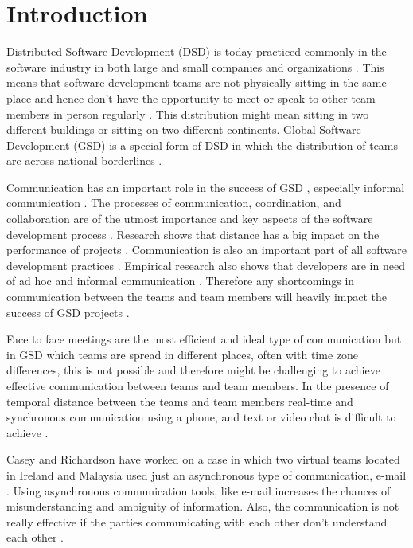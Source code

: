 \chapter{Introduction}
Distributed Software Development (DSD) is today practiced commonly in the software industry in both large and small companies and organizations \citep{shrivastava2010distributed}. This means that software development teams are not physically sitting in the same place and hence don’t have the opportunity to meet or speak to other team members in person regularly \citep{layman2006essential}. This distribution might mean sitting in two different buildings or sitting on two different continents. Global Software Development (GSD) is a special form of DSD in which the distribution of teams are across national borderlines \citep{sahay2003global}. 

Communication has an important role in the success of GSD \citep{carmel2001tactical}\citep{french1998study}, especially informal communication \citep{herbsleb2003empirical}. The processes of communication, coordination, and collaboration are of the utmost importance and key aspects of the software development process \citep{colomo2014agile}. Research shows that distance has a big impact on the performance of projects \citep{damian2003global}\citep{herbsleb2001global}. Communication is also an important part of all software development practices \citep{layman2006essential}. Empirical research also shows that developers are in need of ad hoc and informal communication \citep{grinter1998recomposition}\citep{kraut1995coordination}. Therefore any shortcomings in communication between the teams and team members will heavily impact the success of GSD projects \citep{layman2006essential}.

Face to face meetings are the most efficient and ideal type of communication but in GSD which teams are spread in different places, often with time zone differences, this is not possible and therefore might be challenging to achieve effective communication between teams and team members. In the presence of temporal distance between the teams and team members real-time and synchronous communication using a phone, and text or video chat is difficult to achieve \citep{holmstrom2006agile}\citep{kommeren2007philips}.

Casey and Richardson have worked on a case in which two virtual teams located in Ireland and Malaysia used just an asynchronous type of communication, e-mail \citep{casey2008impact}. Using asynchronous communication tools, like e-mail increases the chances of misunderstanding and ambiguity of information. Also, the communication is not really effective if the parties communicating with each other don’t understand each other \citep{kommeren2007philips}\citep{cataldo2007coordination}.

